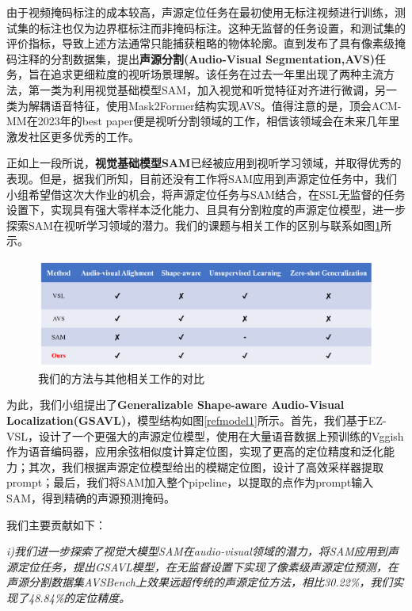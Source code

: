 \documentclass[12pt]{article}
\begin{document}
由于视频掩码标注的成本较高，声源定位任务在最初使用无标注视频进行训练，测试集的标注也仅为边界框标注而非掩码标注。这种无监督的任务设置，和测试集的评价指标，导致上述方法通常只能捕获粗略的物体轮廓。直到\cite{17}发布了具有像素级掩码注释的分割数据集，提出\textbf{声源分割(Audio-Visual Segmentation,AVS)}任务，旨在追求更细粒度的视听场景理解。该任务在过去一年里出现了两种主流方法，第一类为利用视觉基础模型SAM\cite{sam}，加入视觉和听觉特征对齐进行微调\cite{s1,s6,s9}，另一类为解耦语音特征，使用Mask2Former结构实现AVS\cite{s2,s3,s4}。值得注意的是，顶会ACM-MM在2023年的best paper便是视听分割领域的工作\cite{s10}，相信该领域会在未来几年里激发社区更多优秀的工作。

正如上一段所说，\textbf{视觉基础模型SAM}已经被应用到视听学习领域，并取得优秀的表现。但是，据我们所知，目前还没有工作将SAM应用到声源定位任务中，我们小组希望借这次大作业的机会，将声源定位任务与SAM结合，在SSL无监督的任务设置下，实现具有强大零样本泛化能力、且具有分割粒度的声源定位模型，进一步探索SAM在视听学习领域的潜力。我们的课题与相关工作的区别与联系如图\ref{fig:01}所示。
\begin{figure}
    \centering
    \includegraphics[width=1\linewidth]{label.png}
    \caption{我们的方法与其他相关工作的对比}
    \label{fig:01}
\end{figure}

为此，我们小组提出了\textbf{Generalizable Shape-aware Audio-Visual Localization(GSAVL)}，模型结构如图\ref{refmodel1}所示。首先，我们基于EZ-VSL\cite{22}，设计了一个更强大的声源定位模型，使用在大量语音数据上预训练的Vggish作为语音编码器，应用余弦相似度计算定位图，实现了更高的定位精度和泛化能力；其次，我们根据声源定位模型给出的模糊定位图，设计了高效采样器提取prompt；最后，我们将SAM加入整个pipeline，以提取的点作为prompt输入SAM，得到精确的声源预测掩码。

我们主要贡献如下：

\textit{i)我们进一步探索了视觉大模型SAM在audio-visual领域的潜力，将SAM应用到声源定位任务，提出GSAVL模型，在无监督设置下实现了像素级声源定位预测，在声源分割数据集AVSBench上效果远超传统的声源定位方法，相比30.22\%，我们实现了48.84\%的定位精度。}
\end{document}
